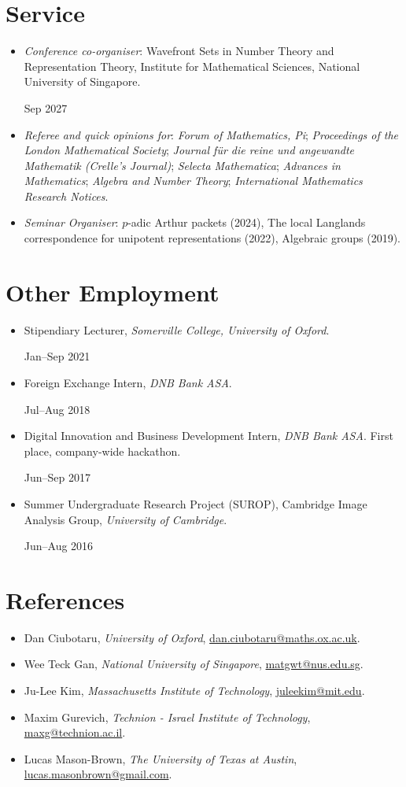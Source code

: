 \documentclass[11pt]{article}
\newcommand{\dateditem}[2]{\Needspace{3\baselineskip}\item
  \begin{minipage}[t]{\dimexpr\linewidth-1.2in\relax}\raggedright #1\end{minipage}\hfill
  \begin{minipage}[t]{1.05in}\raggedleft #2\end{minipage}}
\begin{document}
\section*{Service}
\begin{itemize}
\dateditem{\textit{Conference co-organiser}: Wavefront Sets in Number Theory and Representation Theory, Institute for Mathematical Sciences, National University of Singapore.}{Sep 2027}
\item \textit{Referee and quick opinions for}: \textit{Forum of Mathematics, Pi}; \textit{Proceedings of the London Mathematical Society}; \textit{Journal für die reine und angewandte Mathematik (Crelle's Journal)}; \textit{Selecta Mathematica}; \textit{Advances in Mathematics}; \textit{Algebra and Number Theory}; \textit{International Mathematics Research Notices}.
\item \textit{Seminar Organiser}: $p$-adic Arthur packets (2024), The local Langlands correspondence for unipotent representations (2022), Algebraic groups (2019).
\end{itemize}

\section*{Other Employment}
\begin{itemize}
\dateditem{Stipendiary Lecturer, \textit{Somerville College, University of Oxford}.}{Jan--Sep 2021}
\dateditem{Foreign Exchange Intern, \textit{DNB Bank ASA}.}{Jul--Aug 2018}
\dateditem{Digital Innovation and Business Development Intern, \textit{DNB Bank ASA}. First place, company-wide hackathon.}{Jun--Sep 2017}
\dateditem{Summer Undergraduate Research Project (SUROP), Cambridge Image Analysis Group, \emph{University of Cambridge}.}{Jun--Aug 2016}
\end{itemize}

\section*{References}
\begin{itemize}
\item {Dan Ciubotaru}, \textit{University of Oxford},  \href{mailto:dan.ciubotaru@maths.ox.ac.uk}{dan.ciubotaru@maths.ox.ac.uk}.
\item {Wee Teck Gan}, \textit{National University of Singapore},  \href{mailto:matgwt@nus.edu.sg}{matgwt@nus.edu.sg}.
\item {Ju-Lee Kim}, \textit{Massachusetts Institute of Technology},  \href{mailto:juleekim@mit.edu}{juleekim@mit.edu}.
\item {Maxim Gurevich}, \textit{Technion - Israel Institute of Technology},  \href{mailto:maxg@technion.ac.il}{maxg@technion.ac.il}.
\item {Lucas Mason-Brown}, \textit{The University of Texas at Austin},  \href{mailto:lucas.masonbrown@gmail.com}{lucas.masonbrown@gmail.com}.
\end{itemize}
\end{document}
